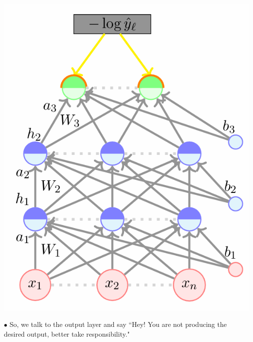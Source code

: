 \documentclass[11pt, a4paper]{article}
\begin{document}
\noindent
\begin{minipage}{0.45\textwidth}
    \includegraphics[scale = 0.5]{image_3.png}
\end{minipage}
\hfill
\begin{minipage}{0.5\textwidth}
    $\bullet$ So, we talk to the output layer and say ``Hey! You are not producing the desired output, better take responsibility."
\end{minipage}
\end{document}
